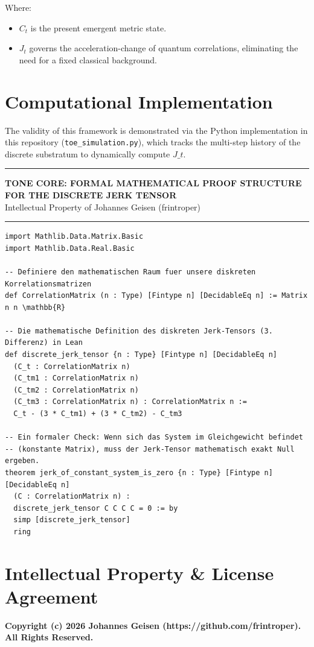 \documentclass[11pt,a4paper]{article}
\begin{document}
Where:
\begin{itemize}
    \item $C_t$ is the present emergent metric state.
    \item $J_t$ governs the acceleration-change of quantum correlations, eliminating the need for a fixed classical background.
\end{itemize}
\clearpage
\section{Computational Implementation}
The validity of this framework is demonstrated via the Python implementation in this repository (\texttt{toe\_simulation.py}), which tracks the multi-step history of the discrete substratum to dynamically compute $J\_t$.

\noindent\rule{\textwidth}{0.4pt}
\begin{center}
\textbf{TONE CORE: FORMAL MATHEMATICAL PROOF STRUCTURE FOR THE DISCRETE JERK TENSOR} \\
Intellectual Property of Johannes Geisen (frintroper)
\end{center}
\noindent\rule{\textwidth}{0.4pt}

\begin{lstlisting}[basicstyle=\small\ttfamily, breaklines=true, frame=single, xleftmargin=10pt, xrightmargin=10pt]
import Mathlib.Data.Matrix.Basic
import Mathlib.Data.Real.Basic

-- Definiere den mathematischen Raum fuer unsere diskreten Korrelationsmatrizen
def CorrelationMatrix (n : Type) [Fintype n] [DecidableEq n] := Matrix n n \mathbb{R}

-- Die mathematische Definition des diskreten Jerk-Tensors (3. Differenz) in Lean
def discrete_jerk_tensor {n : Type} [Fintype n] [DecidableEq n]
  (C_t : CorrelationMatrix n)
  (C_tm1 : CorrelationMatrix n)
  (C_tm2 : CorrelationMatrix n)
  (C_tm3 : CorrelationMatrix n) : CorrelationMatrix n :=
  C_t - (3 * C_tm1) + (3 * C_tm2) - C_tm3

-- Ein formaler Check: Wenn sich das System im Gleichgewicht befindet
-- (konstante Matrix), muss der Jerk-Tensor mathematisch exakt Null ergeben.
theorem jerk_of_constant_system_is_zero {n : Type} [Fintype n] [DecidableEq n]
  (C : CorrelationMatrix n) :
  discrete_jerk_tensor C C C C = 0 := by
  simp [discrete_jerk_tensor]
  ring
\end{lstlisting}

\clearpage

\section{Intellectual Property \& License Agreement}
\textbf{Copyright (c) 2026 Johannes Geisen (https://github.com/frintroper). All Rights Reserved.}
\end{document}
